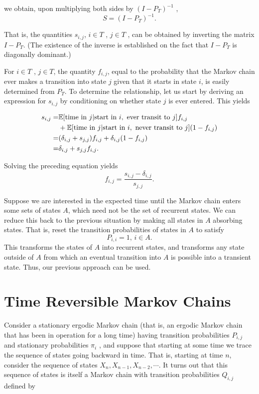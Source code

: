 we obtain, upon multiplying both sides by $(I − P_T )^{−1}$ ,
$$
S = (I - P_T )^{-1}.
$$

That is, the quantities $s_{i,j}$, $i \in T$ , $j \in T$ , can be obtained by inverting the matrix $I - P_T$.
(The existence of the inverse is established on the fact that $I-P_T$ is diagonally dominant.)

For $i \in T$ , $j \in T$, the quantity $f_{i,j}$, equal to the probability that the Markov chain ever makes a transition into state $j$ given that it starts in state $i$, is easily determined from $P_T$. To determine the relationship, let us start by deriving an expression for $s_{i,j}$ by conditioning on whether state $j$ is ever entered. This yields

\begin{align*}
    s_{i,j} = & \mathbb{E} [\text{time in } j |\text{start in } i, \text{ ever transit to } j ] f_{i,j} \\ 
    & + \mathbb{E} [\text{time in } j |\text{start in } i, \text{ never transit to } j ](1 - f_{i,j}) \\ 
    = & (\delta_{i,j} + s_{j,j}) f_{i,j} + \delta_{i,j} (1 - f_{i,j}) \\ 
    = & \delta_{i,j} + s_{j,j} f_{i,j}.
\end{align*}

Solving the preceding equation yields
$$
f_{i,j} = \frac{s_{i,j} - \delta_{i,j}}{s_{j,j}}.
$$

Suppose we are interested in the expected time until the Markov chain enters some sets of states $A$, which need not be the set of recurrent states. We can reduce this back to the previous situation by making all states in $A$ absorbing states. That is, reset the transition probabilities of states in $A$ to satisfy 
$$P_{i,i} = 1,\, i \in A.$$
This transforms the states of $A$ into recurrent states, and transforms any state outside of $A$ from which an eventual transition into $A$ is possible into a transient state. Thus, our previous approach can be used.




\section{Time Reversible Markov Chains}

Consider a stationary ergodic Markov chain (that is, an ergodic Markov chain that has
been in operation for a long time) having transition probabilities $P_{i,j}$ and stationary
probabilities $\pi_i$ , and suppose that starting at some time we trace the sequence of states going backward in time. That is, starting at time $n$, consider the sequence of states $X_n , X_{n-1} , X_{n-2} , \cdots$. It turns out that this sequence of states is itself a Markov chain
with transition probabilities $Q_{i,j}$ defined by

